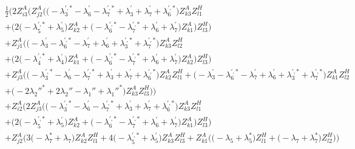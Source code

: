 \begin{align} 
 &\frac{1}{2} \Big(2 Z_{{i 3}}^{A} \Big(Z_{{j 2}}^{A} \Big(\Big(- \lambda^{{\prime},*}_3  - \lambda^{\prime}_6  - \lambda^{{\prime},*}_7  + \lambda^{\prime}_3 + \lambda^{\prime}_7 + \lambda^{{\prime},*}_6\Big)Z_{{k 3}}^{A} Z_{{l 1}}^{H} \nonumber \\ 
 &+\Big(2 \Big(- \lambda^{{\prime},*}_5  + \lambda^{\prime}_5\Big)Z_{{k 2}}^{A}  + \Big(- \lambda^{{\prime},*}_6  - \lambda^{{\prime},*}_7  + \lambda^{\prime}_6 + \lambda^{\prime}_7\Big)Z_{{k 1}}^{A} \Big)Z_{{l 3}}^{H} \Big)\nonumber \\ 
 &+Z_{{j 1}}^{A} \Big(\Big(- \lambda^{\prime}_3  - \lambda^{{\prime},*}_6  - \lambda^{\prime}_7  + \lambda^{\prime}_6 + \lambda^{{\prime},*}_3 + \lambda^{{\prime},*}_7\Big)Z_{{k 3}}^{A} Z_{{l 2}}^{H} \nonumber \\ 
 &+\Big(2 \Big(- \lambda^{{\prime},*}_4  + \lambda^{\prime}_4\Big)Z_{{k 1}}^{A}  + \Big(- \lambda^{{\prime},*}_6  - \lambda^{{\prime},*}_7  + \lambda^{\prime}_6 + \lambda^{\prime}_7\Big)Z_{{k 2}}^{A} \Big)Z_{{l 3}}^{H} \Big)\nonumber \\ 
 &+Z_{{j 3}}^{A} \Big(\Big(- \lambda^{{\prime},*}_3  - \lambda^{\prime}_6  - \lambda^{{\prime},*}_7  + \lambda^{\prime}_3 + \lambda^{\prime}_7 + \lambda^{{\prime},*}_6\Big)Z_{{k 2}}^{A} Z_{{l 1}}^{H} +\Big(- \lambda^{\prime}_3  - \lambda^{{\prime},*}_6  - \lambda^{\prime}_7  + \lambda^{\prime}_6 + \lambda^{{\prime},*}_3 + \lambda^{{\prime},*}_7\Big)Z_{{k 1}}^{A} Z_{{l 2}}^{H} \nonumber \\ 
 &+\Big(-2 \lambda_2''^*  + 2 \lambda_2''  - \lambda_1''  + \lambda_1''^*\Big)Z_{{k 3}}^{A} Z_{{l 3}}^{H} \Big)\Big)\nonumber \\ 
 &+Z_{{i 2}}^{A} \Big(2 Z_{{j 3}}^{A} \Big(\Big(- \lambda^{{\prime},*}_3  - \lambda^{\prime}_6  - \lambda^{{\prime},*}_7  + \lambda^{\prime}_3 + \lambda^{\prime}_7 + \lambda^{{\prime},*}_6\Big)Z_{{k 3}}^{A} Z_{{l 1}}^{H} \nonumber \\ 
 &+\Big(2 \Big(- \lambda^{{\prime},*}_5  + \lambda^{\prime}_5\Big)Z_{{k 2}}^{A}  + \Big(- \lambda^{{\prime},*}_6  - \lambda^{{\prime},*}_7  + \lambda^{\prime}_6 + \lambda^{\prime}_7\Big)Z_{{k 1}}^{A} \Big)Z_{{l 3}}^{H} \Big)\nonumber \\ 
 &+Z_{{j 2}}^{A} \Big(3 \Big(- \lambda_7^*  + \lambda_7\Big)Z_{{k 2}}^{A} Z_{{l 1}}^{H}  + 4 \Big(- \lambda^{{\prime},*}_5  + \lambda^{\prime}_5\Big)Z_{{k 3}}^{A} Z_{{l 3}}^{H}  + Z_{{k 1}}^{A} \Big(\Big(- \lambda_5  + \lambda_5^*\Big)Z_{{l 1}}^{H}  + \Big(- \lambda_7  + \lambda_7^*\Big)Z_{{l 2}}^{H} \Big)\Big)\nonumber \\ 

\end{align}
